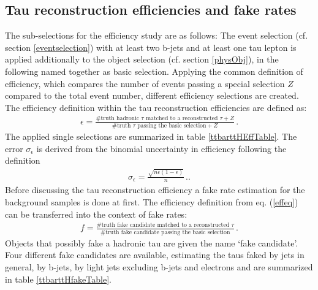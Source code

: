 \subsection{Tau reconstruction efficiencies and fake rates}\label{bgeff}
The sub-selections for the efficiency study are as follows: The event selection (cf. section \ref{eventselection}) with at least two b-jets and at least one tau lepton is applied additionally to the object selection (cf. section \ref{physObj}), in the following named together as basic selection. Applying the common definition of efficiency, which compares the number of events passing a special selection $Z$ compared to the total event number, different efficiency selections are created. The efficiency definition within the tau reconstruction efficiencies are defined as:
\begin{align}
                \epsilon=\frac{\text{\#truth hadronic }\tau\text{ matched to a reconstructed }\tau+Z}{\text{\#truth }\tau\text{ passing the basic selection}+Z}\,\text{.}
\label{effeq}
\end{align}
The applied single selections are summarized in table \ref{ttbarttHEffTable}. The error $\sigma_\epsilon$ is derived from the binomial uncertainty in efficiency following the definition
\begin{align}
\sigma_\epsilon=\frac{\sqrt{n\epsilon\left(1-\epsilon\right)}}{n}\,\text{.}.
\label{binomialerror}
\end{align}
Before discussing the tau reconstruction efficiency a fake rate estimation for the background samples is done at first. The efficiency definition from eq. (\ref{effeq}) can be transferred into the context of fake rates:
\begin{align}
                f=\frac{\text{\#truth fake candidate matched to a reconstructed }\tau}{\text{\#truth fake candidate passing the basic selection}}\,\text{.}
\label{fakeeq}
\end{align}
Objects that possibly fake a hadronic tau are given the name `fake candidate'. Four different fake candidates are available, estimating the taus faked by jets in general, by b-jets, by light jets excluding b-jets and electrons and are summarized in table \ref{ttbarttHfakeTable}.
